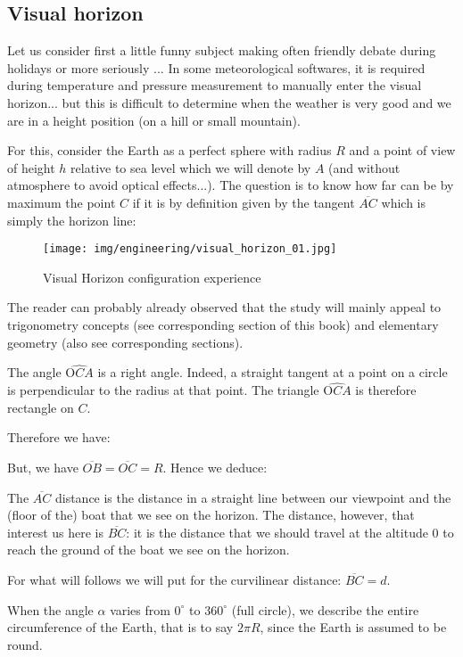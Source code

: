 	\subsection{Visual horizon}
	Let us consider first a little funny subject making often friendly debate during holidays or more seriously ... In some meteorological softwares, it is required during temperature and pressure measurement to manually enter the visual horizon... but this is difficult to determine when the weather is very good and we are in a height position (on a hill or small mountain).

	For this, consider the Earth as a perfect sphere with radius $R$ and a point of view of height $h$ relative to sea level which we will denote by $A$ (and without atmosphere to avoid optical effects...). The question is to know how far can be by maximum the point $C$ if it is by definition given by the tangent $\overline{AC}$ which is simply the horizon line:
	\begin{figure}[H]
		\begin{center}
			\texttt{[image: img/engineering/visual\_horizon\_01.jpg]}
			\caption{Visual Horizon configuration experience}
		\end{center}	
	\end{figure}	
	The reader can probably already observed that the study will mainly appeal to trigonometry concepts (see corresponding section of this book) and elementary geometry (also see corresponding sections).
	
	The angle $\widehat{\text{O}CA}$ is a right angle. Indeed, a straight tangent at a point on a circle is perpendicular to the radius at that point. The triangle $\widehat{\text{O}CA}$  is therefore rectangle on $C$.
	
	Therefore we have:
	
	But, we have $\overline{OB}=\overline{OC}=R$. Hence we deduce:
	
	The $\overline{AC}$ distance is the distance in a straight line between our viewpoint and the (floor of the) boat that we see on the horizon. The distance, however, that interest us here is $\overline{BC}$: it is the distance that we should travel at the altitude $0$ to reach the ground of the boat we see on the horizon.
	
	For what will follows we will put for the curvilinear distance: $\overline{BC}=d$.
	
	When the angle $\alpha$ varies from $0^{\circ}$ to $360^{\circ}$ (full circle), we describe the entire circumference of the Earth, that is to say $2\pi R$, since the Earth is assumed to be round.
	
